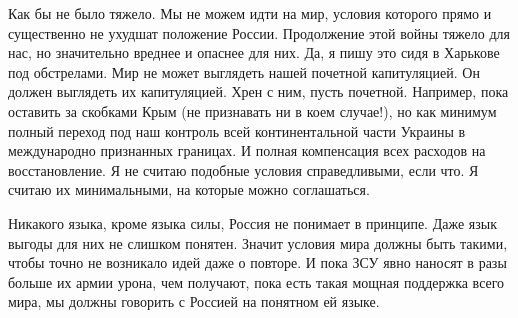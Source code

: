 Как бы не было тяжело. Мы не можем идти на мир, условия которого прямо и
существенно не ухудшат положение России. Продолжение этой войны тяжело для нас,
но значительно вреднее и опаснее для них. Да, я пишу это сидя в Харькове под
обстрелами. Мир не может выглядеть нашей почетной капитуляцией. Он должен
выглядеть их капитуляцией. Хрен с ним, пусть почетной. Например, пока оставить
за скобками Крым (не признавать ни в коем случае!), но как минимум полный
переход под наш контроль всей континентальной части Украины в международно
признанных границах. И полная компенсация всех расходов на восстановление. Я не
считаю подобные условия справедливыми, если что. Я считаю их минимальными, на
которые можно соглашаться.

Никакого языка, кроме языка силы, Россия не понимает в принципе. Даже язык
выгоды для них не слишком понятен. Значит условия мира должны быть такими,
чтобы точно не возникало идей даже о повторе. И пока ЗСУ явно наносят в разы
больше их армии урона, чем получают, пока есть такая мощная поддержка всего
мира, мы должны говорить с Россией на понятном ей языке.
